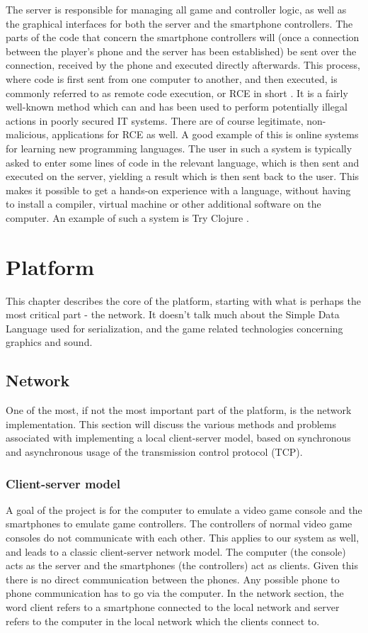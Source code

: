 \documentclass{article}
\begin{document}
The server is responsible for managing all game and controller logic, as well as the graphical
interfaces for both the server and the smartphone controllers. The parts of the code that concern
the smartphone controllers will (once a connection between the player's phone and the server has
been established) be sent over the connection, received by the phone and executed directly
afterwards.
This process, where code is first sent from one computer to another, and then executed, is
commonly referred to as remote code execution, or RCE in short \cite{key:3}. It is a fairly well-known
method which can and has been used to perform potentially illegal actions in poorly secured IT
systems. There are of course legitimate, non-malicious, applications for RCE as well. A good
example of this is online systems for learning new programming languages. The user in such a
system is typically asked to enter some lines of code in the relevant language, which is then sent
and executed on the server, yielding a result which is then sent back to the user. This makes it
possible to get a hands-on experience with a language, without having to install a compiler,
virtual machine or other additional software on the computer. An example of such a system is
Try Clojure \cite{key:4}.


\section{Platform}
This chapter describes the core of the platform, starting with what is perhaps the most critical
part - the network. It doesn't talk much about the Simple Data Language used for serialization, and
 the game related technologies concerning graphics and sound. 

\subsection{Network}
One of the most, if not the most important part of the platform, is the network implementation.
This section will discuss the various methods and problems associated with implementing a local
client-server model, based on synchronous and asynchronous usage of the transmission control
protocol (TCP).

\subsubsection{Client-server model}
A goal of the project is for the computer to emulate a video game console and the smartphones to
emulate game controllers. The controllers of normal video game consoles do not communicate
with each other. This applies to our system as well, and leads to a classic client-server network
model. The computer (the console) acts as the server and the smartphones (the controllers) act as
clients. Given this there is no direct communication between the phones. Any possible phone to
phone communication has to go via the computer. In the network section, the word client refers
to a smartphone connected to the local network and server refers to the computer in the local
network which the clients connect to.
\end{document}

